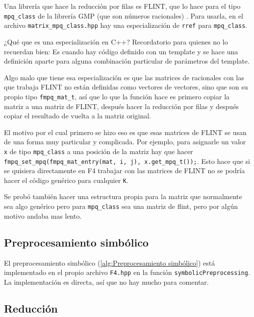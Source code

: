 \documentclass[12pt]{report}
\theoremstyle{customstyle}
\theoremstyle{factstyle}
\begin{document}
Una librería que hace la reducción por filas es FLINT, que lo hace para el tipo \texttt{mpq\_class} de la librería GMP (que son números racionales) \cite{lib:flint, lib:gmp}. Para usarla, en el archivo \texttt{matrix\_mpq\_class.hpp} hay una especialización de \texttt{rref} para \texttt{mpq\_class}.

¿Qué que es una especialización en C++? Recordatorio para quienes no lo recuerdan bien: Es cuando hay código definido con un template y se hace una definición aparte para alguna combinación particular de parámetros del template.

Algo malo que tiene esa especialización es que las matrices de racionales con las que trabaja FLINT no están definidas como vectores de vectores, sino que son su propio tipo \texttt{fmpq\_mat\_t}, así que lo que la función hace es primero copiar la matriz a una matriz de FLINT, después hacer la reducción por filas y después copiar el resultado de vuelta a la matriz original.

El motivo por el cual primero se hizo eso es que esas matrices de FLINT se usan de una forma muy particular y complicada. Por ejemplo, para asignarle un valor \texttt{x} de tipo \texttt{mpq\_class} a una posición de la matriz hay que hacer \texttt{fmpq\_set\_mpq(fmpq\_mat\_entry(mat, i, j), x.get\_mpq\_t());}. Esto hace que si se quisiera directamente en F4 trabajar con las matrices de FLINT no se podría hacer el código genérico para cualquier \texttt{K}.

Se probó también hacer una estructura propia para la matriz que normalmente sea algo genérico pero para \texttt{mpq\_class} sea una matriz de flint, pero por algún motivo andaba mas lento.

\subsection{Preprocesamiento simbólico}

El preprocesamiento simbólico (\cref{alg:Preprocesamiento simbólico}) está implementado en el propio archivo \texttt{F4.hpp} en la función \texttt{symbolicPreprocessing}. La implementación es directa, así que no hay mucho para comentar.

\subsection{Reducción}
\end{document}
